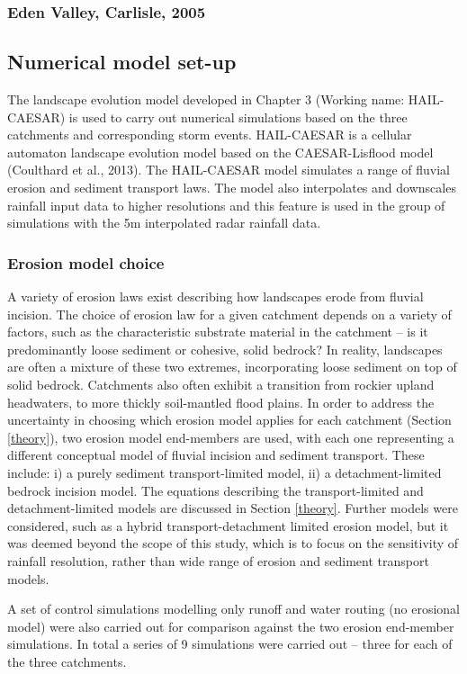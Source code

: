 \subsubsection{Eden Valley, Carlisle, 2005}

\subsection{Numerical model set-up}
The landscape evolution model developed in Chapter 3 (Working name: HAIL-CAESAR) is used to carry out numerical simulations based on the three catchments and corresponding storm events. HAIL-CAESAR is a cellular automaton landscape evolution model based on the CAESAR-Lisflood model (Coulthard et al., 2013). The HAIL-CAESAR model simulates a range of fluvial erosion and sediment transport laws. The model also interpolates and downscales rainfall input data to higher resolutions and this feature is used in the group of simulations with the 5m interpolated radar rainfall data. 

\subsubsection{Erosion model choice}
A variety of erosion laws exist describing how landscapes erode from fluvial incision. The choice of erosion law for a given catchment depends on a variety of factors, such as the characteristic substrate material in the catchment -- is it predominantly loose sediment or cohesive, solid bedrock? In reality, landscapes are often a mixture of these two extremes, incorporating loose sediment on top of solid bedrock. Catchments also often exhibit a transition from rockier upland headwaters, to more thickly soil-mantled flood plains. In order to address the uncertainty in choosing which erosion model applies for each catchment (Section \ref{theory}), two erosion model end-members are used, with each one representing a different conceptual model of fluvial incision and sediment transport. These include: i) a purely sediment transport-limited model, ii) a detachment-limited bedrock incision model. The equations describing the transport-limited and detachment-limited models are discussed in Section \ref{theory}. Further models were considered, such as a hybrid transport-detachment limited erosion model, but it was deemed beyond the scope of this study, which is to focus on the sensitivity of rainfall resolution, rather than wide range of erosion and sediment transport models. 

A set of control simulations modelling only runoff and water routing (no erosional model) were also carried out for comparison against the two erosion end-member simulations. In total a series of 9 simulations were carried out -- three for each of the three catchments.

